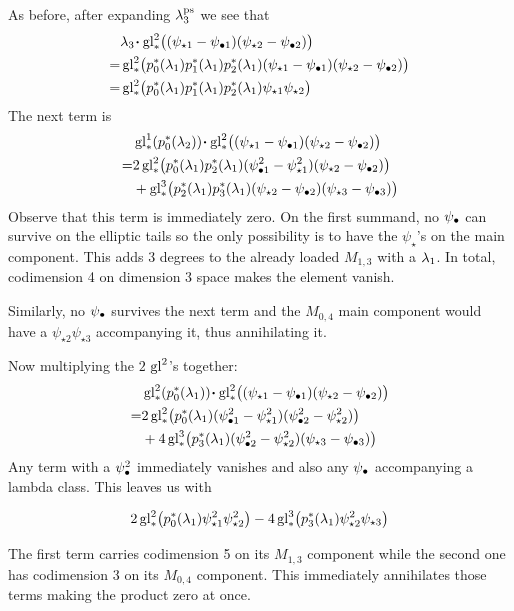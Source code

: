 \documentclass[12pt]{memoir}
\begin{document}
\begin{ptcb}
    As before, after expanding \(\lambda_3^{\operatorname{\mathrm{ps}}}\) we see that
    \begin{align*}
          & \la_3\.\glu_\ast^2\bigl((\psi_{\star1}-\psi_{\81})(\psi_{\star2}-\psi_{\82})\bigr)                                       \\
        = & \glu_\ast^2\bigl(p_0^\ast(\la_1)p_1^\ast(\la_1)p_2^\ast(\la_1)(\psi_{\star1}-\psi_{\81})(\psi_{\star2}-\psi_{\82})\bigr) \\
        = & \glu_\ast^2\bigl(p_0^\ast(\la_1)p_1^\ast(\la_1)p_2^\ast(\la_1)\psi_{\star1}\psi_{\star2}\bigr)
    \end{align*}
    The next term is
    \begin{align*}
          & \glu_\ast^1(p_0^\ast(\la_2))\.\glu_\ast^2\bigl((\psi_{\star1}-\psi_{\81})(\psi_{\star2}-\psi_{\82})\bigr)      \\
        = & 2\glu_\ast^2\bigl(p_0^\ast(\la_1)p_2^\ast(\la_1)(\psi_{\81}^2-\psi_{\star1}^2)(\psi_{\star2}-\psi_{\82})\bigr) \\
          & +\glu_\ast^3\bigl(p_2^\ast(\la_1)p_3^\ast(\la_1)(\psi_{\star2}-\psi_{\82})(\psi_{\star3}-\psi_{\83})\bigr)
    \end{align*}
    Observe that this term is immediately zero. On the first summand, no \(\psi_\bullet\) can survive on the elliptic tails so the only possibility is to have the \(\psi_\star\)'s on the main component. This adds 3 degrees to the already loaded \(M_{1,3}\) with a \(\lambda_1\). In total, codimension 4 on dimension 3 space makes the element vanish.\par
    Similarly, no \(\psi_\bullet\) survives the next term and the \(M_{0,4}\) main component would have a \(\psi_{\star2}\psi_{\star3}\) accompanying it, thus annihilating it.\par
    Now multiplying the \(2\) \(\operatorname{gl}^2\)'s together:
    \begin{align*}
          & \glu_\ast^2(p_0^\ast(\la_1))\.\glu_\ast^2\bigl((\psi_{\star1}-\psi_{\81})(\psi_{\star2}-\psi_{\82})\bigr) \\
        = & 2\glu_\ast^2\bigl(p_0^\ast(\la_1)(\psi_{\81}^2-\psi_{\star1}^2)(\psi_{\82}^2-\psi_{\star2}^2)\bigr)       \\
          & +4\glu_\ast^3\bigl(p_3^\ast(\la_1)(\psi_{\82}^2-\psi_{\star2}^2)(\psi_{\star3}-\psi_{\83})\bigr)
    \end{align*}
    Any term with a \(\psi_\bullet^2\) immediately vanishes and also any \(\psi_\bullet\) accompanying a lambda class. This leaves us with

    \[2\operatorname{gl}_\ast^2\bigl(p_0^\ast(\lambda_1)\psi_{\star1}^2\psi_{\star2}^2\bigr)-4\operatorname{gl}_\ast^3\bigl(p_3^\ast(\lambda_1)\psi^2_{\star2}\psi_{\star3}\bigr)\]

    The first term carries codimension 5 on its \(M_{1,3}\) component while the second one has codimension 3 on its \(M_{0,4}\) component. This immediately annihilates those terms making the product zero at once.
\end{ptcb}
\end{document}
